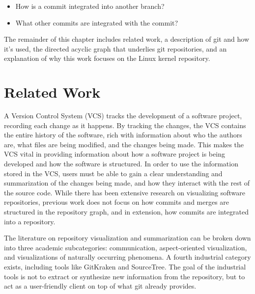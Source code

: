 \begin{textbox}
\begin{itemize}
  \item How is a commit integrated into another branch?
  \item What other commits are integrated with the commit?
\end{itemize}
\end{textbox}

The remainder of this chapter includes related work, a description of
git and how it's used, the directed acyclic graph that underlies git
repositories, and an explanation of why this work focuses on the Linux
kernel repository.

\section{Related Work}\label{sec:related_work}

A Version Control System (VCS) tracks the development of a software project,
recording each change as it happens. By tracking the changes, the VCS
contains the entire history of the software, rich with information about
who the authors are, what files are being modified, and the changes
being made.
This makes the VCS vital in providing information about
how a software project is being developed and how the software is
structured. In order to use the information stored in the VCS, users
must be able to gain a clear understanding and summarization of the
changes being made, and how they interact with the rest of the source
code. While there has been extensive research on visualizing software
repositories, previous work does not focus on how commits and merges are
structured in the repository graph, and in extension, how commits are
integrated into a repository.

The literature on repository visualization
and summarization can be broken down into three academic subcategories:
communication\cite{Cubranic2005,Begel2010}, aspect-oriented
visualization\cite{Ambros2005,Burch2005,Ambros2009}, and visualizations of naturally occurring phenomena\cite{ogawa09,Caudwell2010}.
A fourth industrial category exists, including tools like GitKraken and
SourceTree.
The goal of the industrial tools is not to extract or synthesize new
information from the repository, but to act as a user-friendly client
on top of what git already provides.

